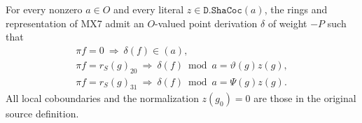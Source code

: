 \begin{proposition}
\label{claim:MX9}
For every nonzero $a\in O$ and every literal
$z\in\texttt{D.ShaCoc}(a)$, the rings and representation
of MX7 admit an $O$-valued point derivation $\delta$ of
weight $-P$ such that
\[
 \begin{gathered}
 \pi f=0\ \Longrightarrow\ \delta(f)\in(a),\\
 \pi f=r_S(g)_{20}\ \Longrightarrow\
       \delta(f)\bmod a=\vartheta(g)z(g),\\
 \pi f=r_S(g)_{31}\ \Longrightarrow\
       \delta(f)\bmod a=\Psi(g)z(g).
 \end{gathered}
 \tag{MX.33}
\]
All local coboundaries and the normalization $z(g_0)=0$
are those in the original source definition.
\end{proposition}
